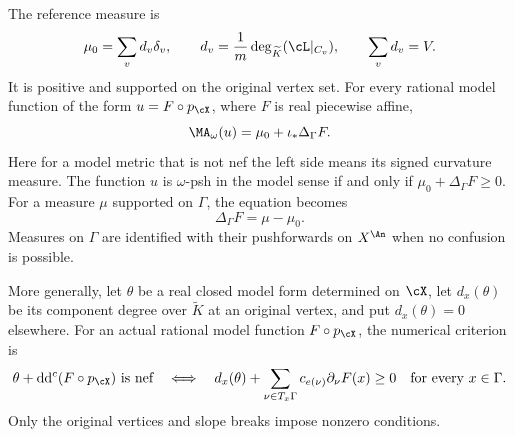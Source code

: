 \begin{lemma}
\label{lem:ch31-curve-ma-affine}
The reference measure is
\[
 \mu_0=\sum_v d_v\delta_v,\qquad
 d_v=\frac1m\deg_{\widetilde K}(\cL|_{C_v}),\qquad
 \sum_vd_v=V.
\]
It is positive and supported on the original vertex set.
For every rational model function of the form
\(u=F\circ p_{\cX}\), where \(F\) is real piecewise affine,
\begin{equation}
\label{eq:curve-ma-laplacian}
                 \MA_\omega(u)=\mu_0+\iota_*\Delta_\Gamma F.
\end{equation}
Here for a model metric that is not nef the left side means its signed
curvature measure.  The function \(u\) is \(\omega\)-psh in the
model sense if and only if \(\mu_0+\Delta_\Gamma F\geq0\).
For a measure \(\mu\) supported on \(\Gamma\), the equation becomes
\begin{equation}
\label{eq:curve-poisson}
                      \Delta_\Gamma F=\mu-\mu_0 .
\end{equation}
Measures on \(\Gamma\) are identified with their pushforwards on
\(X^{\An}\) when no confusion is possible.

More generally, let \(\theta\) be a real closed model form determined
on \(\cX\), let \(d_x(\theta)\) be its component degree over
\(\widetilde K\) at an original vertex, and put \(d_x(\theta)=0\)
elsewhere.  For an actual rational model function
\(F\circ p_{\cX}\), the numerical criterion is
\begin{equation}
\label{eq:curve-slope-criterion}
 \theta+\mathrm d\mathrm d^c(F\circ p_{\cX})\text{ is nef}
 \quad\Longleftrightarrow\quad
 d_x(\theta)+\sum_{\nu\in T_x\Gamma}
       c_{e(\nu)}\partial_\nu F(x)\geq0
 \quad\text{for every }x\in\Gamma.
\end{equation}
Only the original vertices and slope breaks impose nonzero conditions.
\end{lemma}

